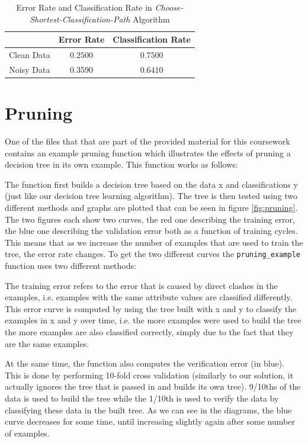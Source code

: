 \documentclass[11pt,a4paper]{article}
\begin{document}
\begin{table}[!ht]
\centering
\begin{tabular}{|c|c|c|}
\hline 
 & \textbf{Error Rate} & \textbf{Classification Rate} \\ 
\hline 
Clean Data & $0.2500$ & $0.7500$ \\ 
\hline 
Noisy Data & $0.3590$ & $0.6410$ \\ 
\hline 
\end{tabular} 
\caption{Error Rate and Classification Rate in \emph{Choose-Shortest-Classification-Path} Algorithm}
\label{tab:chooseDepthRates}
\end{table}

\section{Pruning}

One of the files that that are part of the provided material for this coursework contains an example pruning function which illustrates the effects of pruning a decision tree in its own example. This function works as follows:

The function first builds a decision tree based on the data x and classifications y (just like our decision tree learning algorithm). The tree is then tested using two different methods and graphs are plotted that can be seen in figure \ref{fig:pruning}. The two figures each show two curves, the red one describing the training error, the blue one describing the validation error both as a function of training cycles. This means that as we increase the number of examples that are used to train the tree, the error rate changes.
To get the two different curves the \texttt{pruning\_example} function uses two different methods:

The training error refers to the error that is caused by direct clashes in the examples, i.e. examples with the same attribute values are classified differently. This error curve is computed by using the tree built with x and y to classify the examples in x and y over time, i.e. the more examples were used to build the tree the more examples are also classified correctly, simply due to the fact that they are the same examples.

At the same time, the function also computes the verification error (in blue). This is done by performing 10-fold cross validation (similarly to our solution, it actually ignores the tree that is passed in and builds its own tree). 9/10ths of the data is used to build the tree while the 1/10th is used to verify the data by classifying these data in the built tree. As we can see in the diagrams, the blue curve decreases for some time, until increasing slightly again after some number of examples. 
\end{document}
